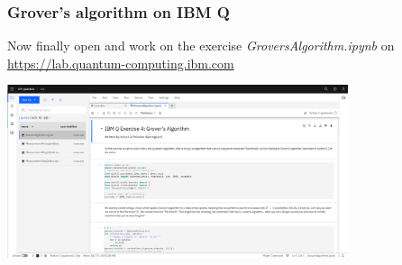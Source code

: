 \documentclass[10pt]{beamer}
\begin{document}
  \begin{frame}
    \frametitle{Grover's algorithm on IBM Q}
    Now finally open and work on the exercise \emph{GroversAlgorithm.ipynb} on \href{https://lab.quantum-computing.ibm.com}{https://lab.quantum-computing.ibm.com}

    \begin{center}
      \includegraphics[width=10cm]{./img/ibm-q-grover.png}
      \end{center}
  \end{frame}
\end{document}
